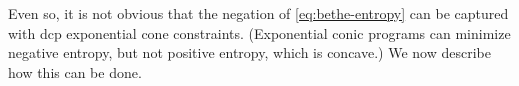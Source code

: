 Even so,
it is not obvious that
the negation of \eqref{eq:bethe-entropy} can be
captured with dcp exponential cone constraints.
(Exponential conic programs can minimize negative entropy,
 but not positive entropy, which is concave.)
We now describe how this can be done.

\def\Par{\mathrm{Par}}
\def\Pash{\mathit{V\mskip-5muC\mskip-3.5muP\!}}

